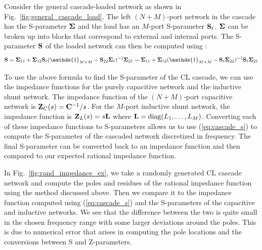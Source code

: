 Consider the general cascade-loaded network as shown in Fig.\ \ref{fig:general_cascade_load}. The left $(N+M)$-port network in the cascade has the S-parameter $\vb{\Sigma}$ and the load has an $M$-port S-parameter $\vb{S}_\ell$. $\vb{\Sigma}$ can be broken up into blocks that correspond to external and internal ports. The S-parameter $\vb{S}$ of the loaded network can then be computed using \cite[Eq. 3.20]{newcomb}:
\begin{align}\label{eq:cascade_s}
    \vb{S} = \vb{\Sigma}_{11} + \vb{\Sigma}_{12}\vb{S}_\ell (\mathds{1}_{M \times M} - \vb{S}_{22}\vb{\Sigma}_\ell)^{-1}\vb{\Sigma}_{21}= \vb{\Sigma}_{11} + \vb{\Sigma}_{12} (\mathds{1}_{M \times M} - \vb{S}_\ell\vb{\Sigma}_{22})^{-1}\vb{S}_\ell\vb{\Sigma}_{21}
\end{align}

To use the above formula to find the S-parameter of the CL cascade, we can use the impedance functions for the purely capacitive network and the inductive shunt network. The impedance function of the $(N+M)$-port capacitive network is $\vb{Z}_C(s) = \vb{C}^{-1}/s$. For the $M$-port inductive shunt network, the impedance function is $\vb{Z}_L(s) = s\vb{L}$ where $\vb{L} = \operatorname{diag}(L_1,\dots,L_M)$. Converting each of these impedance functions to S-parameters allows us to use (\ref{eq:cascade_s}) to compute the S-parameter of the cascaded network discretized in frequency. The final S-parameter can be converted back to an impedance function and then compared to our expected rational impedance function.  

In Fig.\ \ref{fig:rand_impedance_ex}, we take a randomly generated CL cascade network and compute the poles and residues of the rational impedance function using the method discussed above. Then we compare it to the impedance function computed using (\ref{eq:cascade_s}) and the S-parameters of the capacitive and inductive networks. We see that the difference between the two is quite small in the chosen frequency range with some larger deviations around the poles. This is due to numerical error that arises in computing the pole locations and the conversions between S and Z-parameters.

